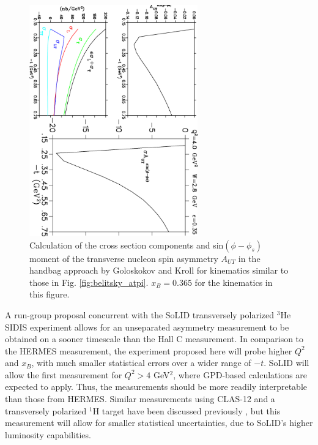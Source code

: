 \documentclass[preprint,superscriptaddress]{revtex4}
\begin{document}
\begin{figure}[hbt!]
\begin{center}
\includegraphics[height=10cm,angle=90.]{goloskokov_qsq4p0_w2p8.ps}
\caption{\label{fig:golo_aut}
Calculation of the cross section components and sin$(\phi-\phi_s)$ moment of
the transverse nucleon spin asymmetry $A_{UT}$ in the handbag approach by
Goloskokov and Kroll \cite{GoPC} for kinematics similar to those in
Fig. \ref{fig:belitsky_atpi}.  $x_B=0.365$ for the kinematics in this
figure.}
\end{center}
\end{figure}

A run-group proposal concurrent with the SoLID transversely polarized $^3$He
SIDIS experiment allows for an unseparated asymmetry measurement to be obtained
on a sooner timescale than the Hall C measurement.  In comparison to the HERMES
measurement, the experiment proposed here will probe higher $Q^2$ and $x_B$,
with much smaller statistical errors over a wider range of $-t$.
SoLID will allow the first measurement for $Q^2>4$ GeV$^2$, where GPD-based
calculations are expected to apply.  Thus, the measurements should be more
readily interpretable than those from HERMES.  Similar measurements using
CLAS-12 and a transversely polarized $^1$H target have been discussed
previously \cite{clas}, but this measurement will allow for smaller statistical
uncertainties, due to SoLID's higher luminosity capabilities.
\end{document}
